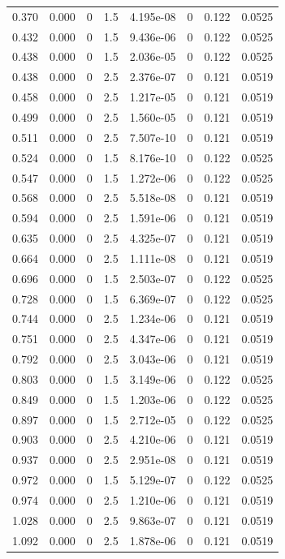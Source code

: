 \documentclass[preview]{standalone}
\begin{document}
{{\begin{tabular}{L{1.2cm}C{1.2cm} C{0.3cm}C{0.5cm} C{1.4cm}C{1.4cm} C{1.4cm}C{1.4cm}}
  0.370  &  0.000  & 0     & 1.5 &  4.195e-08  & 0  & 0.122 &  0.0525   \\ 
  0.432  &  0.000  & 0     & 1.5 &  9.436e-06  & 0  & 0.122 &  0.0525   \\ 
  0.438  &  0.000  & 0     & 1.5 &  2.036e-05  & 0  & 0.122 &  0.0525   \\ 
  0.438  &  0.000  & 0     & 2.5 &  2.376e-07  & 0  & 0.121 &  0.0519   \\ 
  0.458  &  0.000  & 0     & 2.5 &  1.217e-05  & 0  & 0.121 &  0.0519   \\ 
  0.499  &  0.000  & 0     & 2.5 &  1.560e-05  & 0  & 0.121 &  0.0519   \\ 
  0.511  &  0.000  & 0     & 2.5 &  7.507e-10  & 0  & 0.121 &  0.0519   \\ 
  0.524  &  0.000  & 0     & 1.5 &  8.176e-10  & 0  & 0.122 &  0.0525   \\ 
  0.547  &  0.000  & 0     & 1.5 &  1.272e-06  & 0  & 0.122 &  0.0525   \\ 
  0.568  &  0.000  & 0     & 2.5 &  5.518e-08  & 0  & 0.121 &  0.0519   \\ 
  0.594  &  0.000  & 0     & 2.5 &  1.591e-06  & 0  & 0.121 &  0.0519   \\ 
  0.635  &  0.000  & 0     & 2.5 &  4.325e-07  & 0  & 0.121 &  0.0519   \\ 
  0.664  &  0.000  & 0     & 2.5 &  1.111e-08  & 0  & 0.121 &  0.0519   \\ 
  0.696  &  0.000  & 0     & 1.5 &  2.503e-07  & 0  & 0.122 &  0.0525   \\ 
  0.728  &  0.000  & 0     & 1.5 &  6.369e-07  & 0  & 0.122 &  0.0525   \\ 
  0.744  &  0.000  & 0     & 2.5 &  1.234e-06  & 0  & 0.121 &  0.0519   \\ 
  0.751  &  0.000  & 0     & 2.5 &  4.347e-06  & 0  & 0.121 &  0.0519   \\ 
  0.792  &  0.000  & 0     & 2.5 &  3.043e-06  & 0  & 0.121 &  0.0519   \\ 
  0.803  &  0.000  & 0     & 1.5 &  3.149e-06  & 0  & 0.122 &  0.0525   \\ 
  0.849  &  0.000  & 0     & 1.5 &  1.203e-06  & 0  & 0.122 &  0.0525   \\ 
  0.897  &  0.000  & 0     & 1.5 &  2.712e-05  & 0  & 0.122 &  0.0525   \\ 
  0.903  &  0.000  & 0     & 2.5 &  4.210e-06  & 0  & 0.121 &  0.0519   \\ 
  0.937  &  0.000  & 0     & 2.5 &  2.951e-08  & 0  & 0.121 &  0.0519   \\ 
  0.972  &  0.000  & 0     & 1.5 &  5.129e-07  & 0  & 0.122 &  0.0525   \\ 
  0.974  &  0.000  & 0     & 2.5 &  1.210e-06  & 0  & 0.121 &  0.0519   \\ 
  1.028  &  0.000  & 0     & 2.5 &  9.863e-07  & 0  & 0.121 &  0.0519   \\ 
  1.092  &  0.000  & 0     & 2.5 &  1.878e-06  & 0  & 0.121 &  0.0519   \\ 
\hline 
\end{tabular} 

}}
\end{document}
